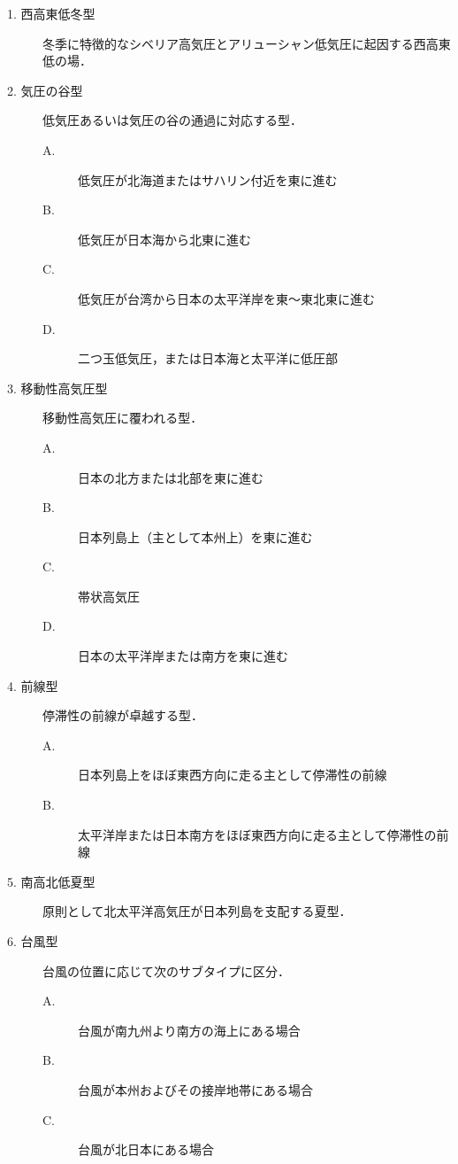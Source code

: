 \documentclass{jarticle}
\theoremstyle{definition}
\begin{document}
\begin{description}
\item[1. 西高東低冬型] 冬季に特徴的なシベリア高気圧とアリューシャン低気圧に起因する西高東低の場．

\item[2. 気圧の谷型] 低気圧あるいは気圧の谷の通過に対応する型．
  \begin{description}
    \item[A.] 低気圧が北海道またはサハリン付近を東に進む
    \item[B.] 低気圧が日本海から北東に進む
    \item[C.] 低気圧が台湾から日本の太平洋岸を東〜東北東に進む
    \item[D.] 二つ玉低気圧，または日本海と太平洋に低圧部
  \end{description}

\item[3. 移動性高気圧型] 移動性高気圧に覆われる型．
  \begin{description}
    \item[A.] 日本の北方または北部を東に進む
    \item[B.] 日本列島上（主として本州上）を東に進む
    \item[C.] 帯状高気圧
    \item[D.] 日本の太平洋岸または南方を東に進む
  \end{description}

\item[4. 前線型] 停滞性の前線が卓越する型．
  \begin{description}
    \item[A.] 日本列島上をほぼ東西方向に走る主として停滞性の前線
    \item[B.] 太平洋岸または日本南方をほぼ東西方向に走る主として停滞性の前線
  \end{description}

\item[5. 南高北低夏型] 原則として北太平洋高気圧が日本列島を支配する夏型．

\item[6. 台風型] 台風の位置に応じて次のサブタイプに区分．
  \begin{description}
    \item[A.] 台風が南九州より南方の海上にある場合
    \item[B.] 台風が本州およびその接岸地帯にある場合
    \item[C.] 台風が北日本にある場合
  \end{description}
\end{description}
\end{document}
